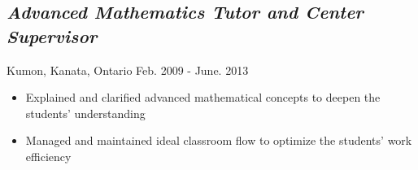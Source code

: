 \documentclass[12pt]{article}
\begin{document}
\begin{minipage}[t]{0.8\linewidth}
	\subsection*{\textit{Advanced Mathematics Tutor and Center Supervisor}} \vspace{-6pt}
		Kumon, Kanata, Ontario \hspace{90pt} Feb. 2009 - June. 2013
		\begin{itemize}
			\item Explained and clarified advanced mathematical concepts to deepen the students' understanding
			\item Managed and maintained ideal classroom flow to optimize the students' work efficiency
		\end{itemize}
\end{minipage}
\end{document}
